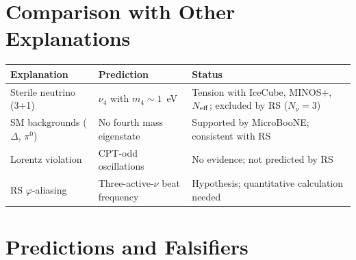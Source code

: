 \documentclass[12pt,a4paper]{article}
\theoremstyle{definition}
\theoremstyle{remark}
\begin{document}
\section{Comparison with Other Explanations}
\label{sec:compare}

\begin{center}
\renewcommand{\arraystretch}{1.3}
\begin{tabular}{p{3.2cm}p{3.8cm}p{5.2cm}}
\toprule
\textbf{Explanation} & \textbf{Prediction} & \textbf{Status} \\
\midrule
Sterile neutrino (3+1) & $\nu_4$ with $m_4 \sim 1$~eV & Tension with
IceCube, MINOS+, $N_{\rm eff}$; excluded by RS ($N_\nu = 3$) \\
SM backgrounds ($\Delta$, $\pi^0$) & No fourth mass eigenstate & 
Supported by MicroBooNE; consistent with RS \\
Lorentz violation & CPT-odd oscillations & No evidence; not predicted by RS \\
RS $\varphi$-aliasing & Three-active-$\nu$ beat frequency & 
Hypothesis; quantitative calculation needed \\
\bottomrule
\end{tabular}
\end{center}

\section{Predictions and Falsifiers}
\label{sec:predict}
\end{document}
